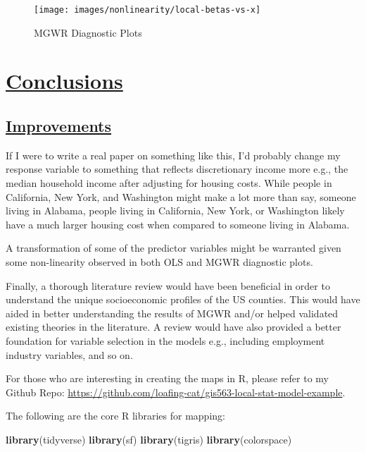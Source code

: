 \documentclass[
]{article}
\newenvironment{Shaded}{\begin{snugshade}}{\end{snugshade}}
\newcommand{\FunctionTok}[1]{\textcolor[rgb]{0.13,0.29,0.53}{\textbf{#1}}}
\newcommand{\NormalTok}[1]{#1}
\begin{document}
\begin{figure}[H]

{\centering \texttt{[image: images/nonlinearity/local-betas-vs-x]} 

}

\caption{MGWR Diagnostic Plots}\label{fig:unnamed-chunk-18}
\end{figure}

\newpage

\section{\texorpdfstring{\ul{Conclusions}}{Conclusions}}\label{conclusions}

\subsection{\texorpdfstring{\ul{Improvements}}{Improvements}}\label{improvements}

If I were to write a real paper on something like this, I'd probably
change my response variable to something that reflects discretionary
income more e.g., the median household income after adjusting for
housing costs. While people in California, New York, and Washington
might make a lot more than say, someone living in Alabama, people living
in California, New York, or Washington likely have a much larger housing
cost when compared to someone living in Alabama.

A transformation of some of the predictor variables might be warranted
given some non-linearity observed in both OLS and MGWR diagnostic plots.

Finally, a thorough literature review would have been beneficial in
order to understand the unique socioeconomic profiles of the US
counties. This would have aided in better understanding the results of
MGWR and/or helped validated existing theories in the literature. A
review would have also provided a better foundation for variable
selection in the models e.g., including employment industry variables,
and so on.

For those who are interesting in creating the maps in R, please refer to
my Github Repo:
\url{https://github.com/loafing-cat/gis563-local-stat-model-example}.

The following are the core R libraries for mapping:

\begin{Shaded}
\begin{Highlighting}[]
\FunctionTok{library}\NormalTok{(tidyverse)}
\FunctionTok{library}\NormalTok{(sf)}
\FunctionTok{library}\NormalTok{(tigris)}
\FunctionTok{library}\NormalTok{(colorspace)}
\end{Highlighting}
\end{Shaded}
\end{document}
